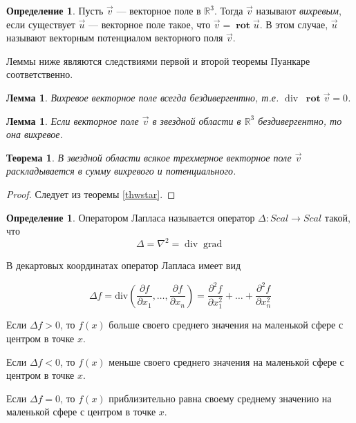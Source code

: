 \documentclass[a5paper]{article}
\newcounter{through}
\theoremstyle{plain}
\newtheorem{theorem}[through]{Теорема}
\newtheorem{lemma}[through]{Лемма}
\theoremstyle{definition}
\newtheorem{definition}[through]{Определение}
\numberwithin{through}{section}
\numberwithin{equation}{section}
\DeclareMathOperator{\rot}{\textbf{rot}}
\DeclareMathOperator{\grad}{grad}
\DeclareMathOperator{\diver}{div}
\begin{document}
\begin{definition}
	Пусть $\vec{v}$ --- векторное поле в $\mathbb{R}^3$. Тогда $\vec{v}$ называют \textit{вихревым}, если существует $\vec{u}$ --- векторное поле такое, что $\vec{v} = \rot \vec{u}$. В этом случае, $\vec{u}$ называют векторным потенциалом векторного поля $\vec{v}$.
\end{definition}

Леммы ниже являются следствиями первой и второй теоремы Пуанкаре соответственно.

\begin{lemma}
	Вихревое векторное поле всегда бездивергентно, т.е. $\diver \; \rot \vec{v} = 0$.
\end{lemma}

\begin{lemma}
	Если векторное поле $\vec{v}$ в звездной области в $\mathbb{R}^3$ бездивергентно, то она вихревое.
\end{lemma}

\begin{theorem}
	В звездной области всякое трехмерное векторное поле $\vec{v}$ раскладывается в сумму вихревого и потенциального.
\end{theorem}

\begin{proof}
	Следует из теоремы \ref{thwstar}.
\end{proof}

\begin{definition}
	Оператором Лапласа называется оператор $\Delta : Scal \to Scal$ такой, что 
	\begin{equation*}
		\Delta = \nabla^2 = \diver \grad
	\end{equation*}
\end{definition}

В декартовых координатах оператор Лапласа имеет вид

\begin{equation*}
\Delta f = \mathrm{div} \left(\frac{\partial f}{\partial x_1}, \ldots, \frac{\partial f}{\partial x_n}\right) = \frac{\partial^2 f}{\partial x_1^2} + \ldots + \frac{\partial^2 f}{\partial x_n^2}
\end{equation*}

Если $\Delta f > 0$, то $f(x)$ больше своего среднего значения на маленькой сфере с центром в точке $x$.

Если $\Delta f < 0$, то $f(x)$ меньше своего среднего значения на маленькой сфере с центром в точке $x$.

Если $\Delta f = 0$, то $f(x)$ приблизительно равна своему среднему значению на маленькой сфере с центром в точке $x$.
\end{document}
